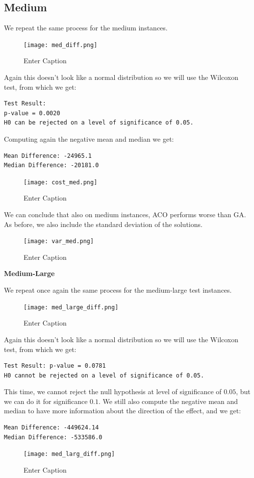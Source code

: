\documentclass{article}
\begin{document}
\subsection{Medium}

We repeat the same process for the medium instances.
\begin{figure}[H]
    \centering
    \texttt{[image: med\_diff.png]}
    \caption{Enter Caption}
    \label{fig:enter-label}
\end{figure}
Again this doesn't look like a normal distribution so we will use the Wilcoxon test, from which we get:
\begin{verbatim}
Test Result: 
p-value = 0.0020 
H0 can be rejected on a level of significance of 0.05. 
\end{verbatim}
Computing again the negative mean and median we get:
\begin{verbatim}
Mean Difference: -24965.1 
Median Difference: -20181.0 
\end{verbatim}
\begin{figure}[H]
    \centering
    \texttt{[image: cost\_med.png]}
    \caption{Enter Caption}
    \label{fig:enter-label}
\end{figure}

We can conclude that also on medium instances, ACO performs worse than GA.
As before, we also include the standard deviation of the solutions.

\begin{figure}[H]
    \centering
    \texttt{[image: var\_med.png]}
    \caption{Enter Caption}
    \label{fig:enter-label}
\end{figure}

\textbf{Medium-Large}

We repeat once again the same process for the medium-large test instances.
\begin{figure}[H]
    \centering
    \texttt{[image: med\_large\_diff.png]}
    \caption{Enter Caption}
    \label{fig:enter-label}
\end{figure}

Again this doesn't look like a normal distribution so we will use the Wilcoxon test, from which we get:
\begin{verbatim}
Test Result: p-value = 0.0781 
H0 cannot be rejected on a level of significance of 0.05. 
\end{verbatim}
This time, we cannot reject the null hypothesis at level of significance of $0.05$, but we can do it for significance $0.1$. We still also compute the negative mean and median to have more information about the direction of the effect, and we get:
\begin{verbatim}
Mean Difference: -449624.14 
Median Difference: -533586.0 
\end{verbatim}
\begin{figure}[H]
    \centering
    \texttt{[image: med\_larg\_diff.png]}
    \caption{Enter Caption}
    \label{fig:enter-label}
\end{figure}
\end{document}
